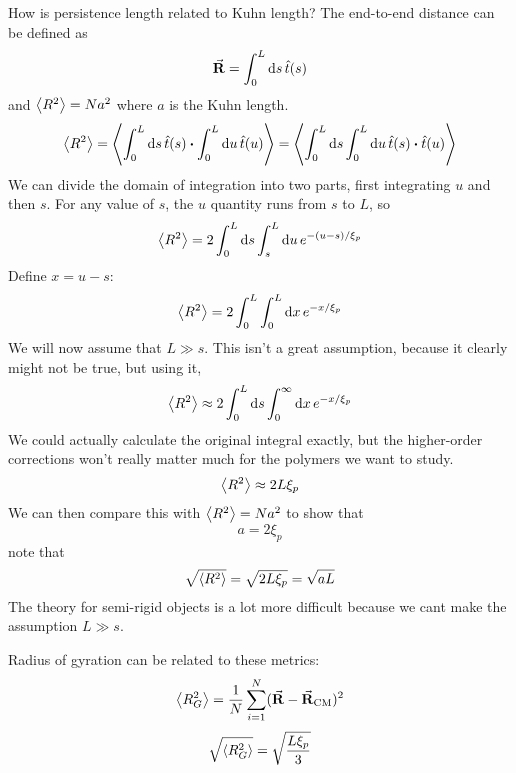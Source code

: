 \documentclass[a4paper,twoside,master.tex]{subfiles}
\begin{document}
How is persistence length related to Kuhn length? The end-to-end distance can be defined as
\begin{equation}
    \va{R} = \int_0^L \dd{s} \hat{t}(s)
\end{equation}
and $ \ev{R^2} = Na^2 $ where $ a $ is the Kuhn length.
\begin{equation}
    \ev{R^2} = \ev{\int_0^L \dd{s} \hat{t}(s) \vdot \int_0^L \dd{u} \hat{t}(u)} = \ev{\int_0^L \dd{s} \int_0^L \dd{u} \hat{t}(s) \vdot \hat{t}(u)}
\end{equation}
We can divide the domain of integration into two parts, first integrating $ u $ and then $ s $. For any value of $ s $, the $ u $ quantity runs from $ s $ to $ L $, so
\begin{equation}
    \ev{R^2} = 2\int_0^L \dd{s} \int_s^L \dd{u} e^{-(u-s)/ \xi_p}
\end{equation}
Define $ x = u - s $:
\begin{equation}
    \ev{R^2} = 2 \int_0^L \int_0^L \dd{x} e^{-x/ \xi_p}
\end{equation}
We will now assume that $ L \gg s $. This isn't a great assumption, because it clearly might not be true, but using it,
\begin{equation}
    \ev{R^2} \approx 2 \int_0^L \dd{s} \int_0^{\infty} \dd{x} e^{-x / \xi_p}
\end{equation}
We could actually calculate the original integral exactly, but the higher-order corrections won't really matter much for the polymers we want to study.
\begin{equation}
    \ev{R^2} \approx 2L \xi_p
\end{equation}
We can then compare this with $ \ev{R^2} = N a^2 $ to show that
\begin{equation}
    a = 2 \xi_p
\end{equation}
note that
\begin{equation}
    \sqrt{\ev{R^2}} = \sqrt{2L \xi_p} = \sqrt{aL}
\end{equation}
The theory for semi-rigid objects is a lot more difficult because we cant make the assumption $ L \gg s $.

Radius of gyration can be related to these metrics:
\begin{equation}
    \ev{R^2_G} = \frac{1}{N} \sum_{i=1}^{N} (\va{R} - \va{R}_{\text{CM}})^2
\end{equation}
\begin{equation}
    \sqrt{\ev{R^2_G}} = \sqrt{\frac{L \xi_p}{3}}
\end{equation}
\end{document}
